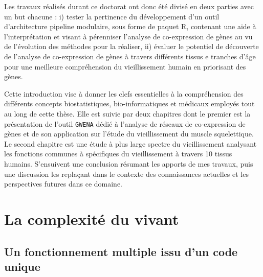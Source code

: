 Les travaux réalisés durant ce doctorat ont donc été divisé en deux parties avec un but chacune : i) tester la pertinence du développement d'un outil d'architecture pipeline modulaire, sous forme de paquet R, contenant une aide à l'interprétation et visant à pérenniser l'analyse de co-expression de gènes au vu de l'évolution des méthodes pour la réaliser, ii) évaluer le potentiel de découverte de l'analyse de co-expression de gènes à travers différents tissus e tranches d'âge pour une meilleure compréhension du vieillissement humain en priorisant des gènes.

Cette introduction vise à donner les clefs essentielles à la compréhension des différents concepts biostatistiques, bio-informatiques et médicaux employés tout au long de cette thèse. Elle est suivie par deux chapitres dont le premier est la présentation de l'outil \verb+GWENA+ dédié à l'analyse de réseaux de co-expression de gènes et de son application sur l'étude du vieillissement du muscle squelettique. Le second chapitre est une étude à plus large spectre du vieillissement analysant les fonctions communes à spécifiques du vieillissement à travers 10 tissus humains. S’ensuivent une conclusion résumant les apports de mes travaux, puis une discussion les replaçant dans le contexte des connaissances actuelles et les perspectives futures dans ce domaine.




\section{La complexité du vivant}

\subsection{Un fonctionnement multiple issu d'un code unique}

